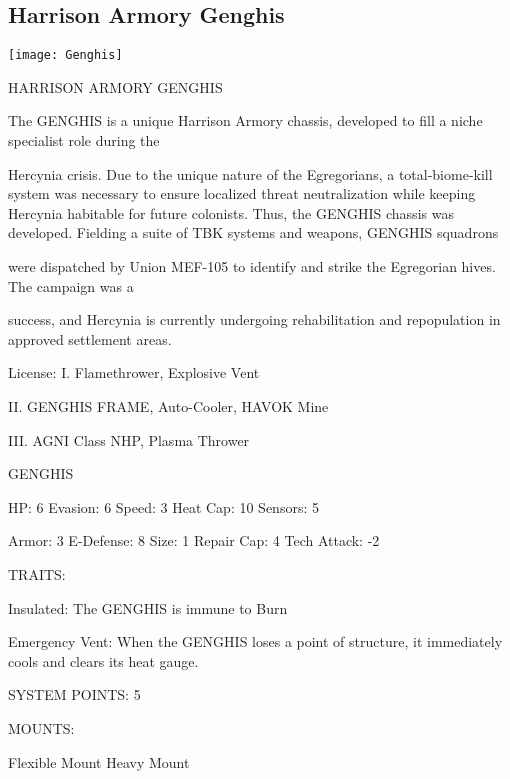 \subsection{Harrison Armory Genghis}

\begin{center}
    \texttt{[image: Genghis]}
\end{center}

                                  HARRISON ARMORY GENGHIS

The GENGHIS is a unique Harrison Armory chassis, developed to fill a niche specialist role during the

Hercynia crisis. Due to the unique nature of the Egregorians, a total-biome-kill system was necessary to
ensure localized threat neutralization while keeping Hercynia habitable for future colonists. Thus, the
GENGHIS chassis was developed. Fielding a suite of TBK systems and weapons, GENGHIS squadrons

were dispatched by Union MEF-105 to identify and strike the Egregorian hives. The campaign was a

success, and Hercynia is currently undergoing rehabilitation and repopulation in approved settlement areas.

                                                       License:
I. Flamethrower, Explosive Vent

II. GENGHIS FRAME, Auto-Cooler, HAVOK Mine

III. AGNI Class NHP, Plasma Thrower





                                                GENGHIS

HP: 6          Evasion: 6                            Speed: 3            Heat Cap: 10       Sensors: 5

Armor: 3       E-Defense: 8                          Size: 1             Repair Cap: 4      Tech Attack: -2

                                                  TRAITS:

Insulated: The GENGHIS is immune to Burn

Emergency Vent: When the GENGHIS loses a point of structure, it immediately cools and clears its
heat gauge.

                                            SYSTEM POINTS: 5

                                                 MOUNTS:

Flexible Mount                                        Heavy Mount

